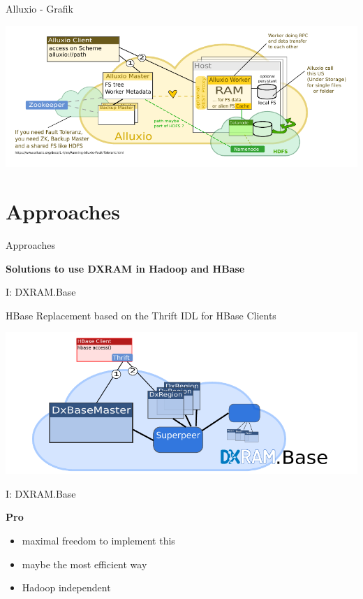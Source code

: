 \begin{frame}{Alluxio - Grafik}
\protect\hypertarget{alluxio---grafik}{}

\includegraphics{fig/alluxio.pdf}

\end{frame}

\hypertarget{approaches}{%
\section{Approaches}\label{approaches}}

\begin{frame}{Approaches}
\protect\hypertarget{approaches-1}{}

\textbf{Solutions to use DXRAM in Hadoop and HBase}

\end{frame}

\begin{frame}{I: DXRAM.Base}
\protect\hypertarget{i-dxram.base}{}

HBase Replacement based on the Thrift IDL for HBase Clients

\includegraphics{fig/replacement.pdf}

\end{frame}

\begin{frame}{I: DXRAM.Base}
\protect\hypertarget{i-dxram.base-1}{}

\textbf{Pro}

\begin{itemize}
\tightlist
\item
  maximal freedom to implement this
\item
  maybe the most efficient way
\item
  Hadoop independent
\end{itemize}

\end{frame}

